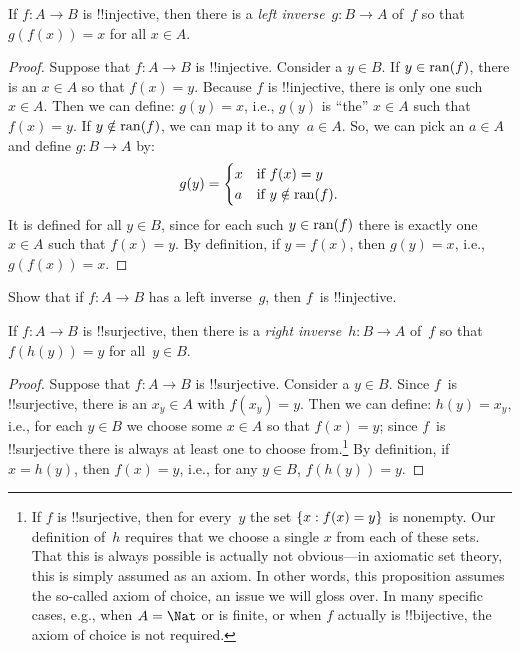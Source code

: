 \documentclass[../../../include/open-logic-section]{subfiles}
\begin{document}
\begin{prop}
If $f\colon A \to B$ is !!{injective}, then there is a \emph{left
inverse}~$g\colon B \to A$ of~$f$ so that $g(f(x)) = x$ for all $x
\in A$.
\end{prop}

\begin{proof}
Suppose that $f\colon A \to B$ is !!{injective}. Consider a $y \in B$.
If $y \in \mathrm{ran}(f)$, there is an $x \in A$ so that $f(x) = y$. Because
$f$ is !!{injective}, there is only one such~$x \in A$. Then we can
define: $g(y) = x$, i.e., $g(y)$ is ``the'' $x \in A$ such that $f(x)
= y$.  If $y \notin \mathrm{ran}(f)$, we can map it to any~$a \in A$. So, we
can pick an $a \in A$ and define $g\colon B \to A$ by:
\[
g(y) = \begin{cases}
    x & \text{if $f(x) = y$}\\
    a & \text{if $y \notin \ran{f}$.}
\end{cases}
\]
It is defined for all $y \in B$, since for each such $y \in \mathrm{ran}(f)$
there is exactly one $x \in A$ such that $f(x) = y$. By definition, if
$y = f(x)$, then $g(y) = x$, i.e., $g(f(x)) = x$.
\end{proof}

\begin{prob}
Show that if $f\colon A \to B$ has a left inverse~$g$, then $f$~is
!!{injective}.
\end{prob}

\begin{prop}
    If $f\colon A \to B$ is !!{surjective}, then there is a
    \emph{right inverse}~$h\colon B \to A$ of~$f$ so that $f(h(y)) =
    y$ for all~$y \in B$.
\end{prop}

\begin{proof}
Suppose that $f\colon A \to B$ is !!{surjective}. Consider a $y \in
B$. Since $f$~is !!{surjective}, there is an $x_y \in A$ with $f(x_y)
= y$.  Then we can define: $h(y) = x_y$, i.e., for each $y \in B$ we
choose some $x \in A$ so that $f(x) = y$; since $f$~is !!{surjective}
there is always at least one to choose from.\footnote{If $f$ is
!!{surjective}, then for every~$y$ the set $\{ x : f(x) = y \}$ is
nonempty. Our definition of~$h$ requires that we choose a single $x$
from each of these sets. That this is always possible is actually not
obvious---in axiomatic set theory, this is simply assumed as an axiom.
In other words, this proposition assumes the so-called axiom of
choice, an issue we will gloss over.  In many specific cases, e.g.,
when $A = \Nat$ or is finite, or when $f$ actually is !!{bijective},
the axiom of choice is not required.} By definition, if $x = h(y)$,
then $f(x) = y$, i.e., for any $y \in B$, $f(h(y)) = y$.
\end{proof}
\end{document}
